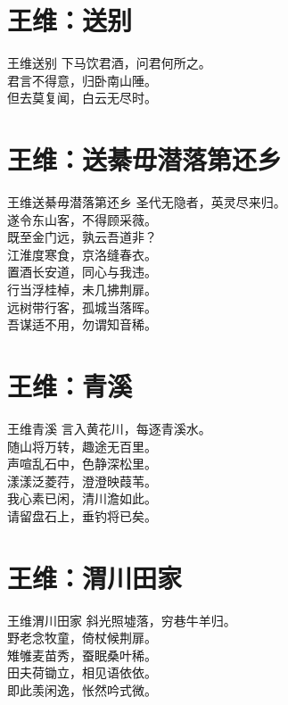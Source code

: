 \documentclass[12pt,oneside,a5paper]{book}
\begin{document}
\chapter{王维：送别}
\begin{poemzh}{王维}{送别}
下马饮君酒，问君何所之。\\
君言不得意，归卧南山陲。\\
但去莫复闻，白云无尽时。\\ 
\end{poemzh}

\chapter{王维：送綦毋潜落第还乡}
\begin{poemzh}{王维}{送綦毋潜落第还乡}
圣代无隐者，英灵尽来归。\\
遂令东山客，不得顾采薇。\\
既至金门远，孰云吾道非？\\
江淮度寒食，京洛缝春衣。\\
置酒长安道，同心与我违。\\
行当浮桂棹，未几拂荆扉。\\
远树带行客，孤城当落晖。\\
吾谋适不用，勿谓知音稀。\\ 
\end{poemzh}

\chapter{王维：青溪}
\begin{poemzh}{王维}{青溪}
言入黄花川，每逐青溪水。\\
随山将万转，趣途无百里。\\
声喧乱石中，色静深松里。\\
漾漾泛菱荇，澄澄映葭苇。\\
我心素已闲，清川澹如此。\\
请留盘石上，垂钓将已矣。\\ 
\end{poemzh}

\chapter{王维：渭川田家}
\begin{poemzh}{王维}{渭川田家}
斜光照墟落，穷巷牛羊归。\\
野老念牧童，倚杖候荆扉。\\
雉雊麦苗秀，蚕眠桑叶稀。\\
田夫荷锄立，相见语依依。\\
即此羡闲逸，怅然吟式微。\\ 
\end{poemzh}
\end{document}
